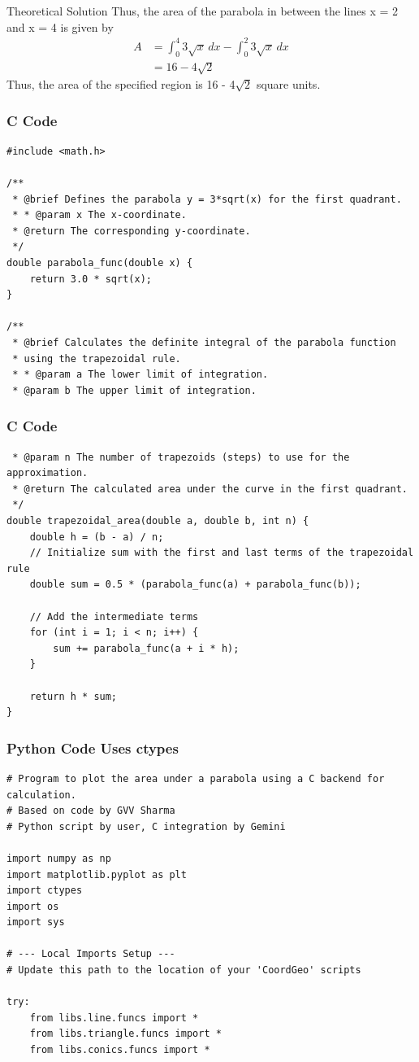 \documentclass{beamer}
\begin{document}
\begin{frame}{Theoretical Solution}
Thus, the area of the parabola in between the lines x = 2 and
x = 4 is given by
\begin{align}
A &= \int_{0}^{4} 3\sqrt{x} \, dx -\int_{0}^{2} 3\sqrt{x}\,dx  \\
&= 16 - 4\sqrt{2}
\end{align}
Thus, the area of the specified region is 16 - 4$\sqrt{2}$ square units.
\end{frame}
\begin{frame}[fragile]
\frametitle{C Code}
\begin{lstlisting}
#include <math.h>

/**
 * @brief Defines the parabola y = 3*sqrt(x) for the first quadrant.
 * * @param x The x-coordinate.
 * @return The corresponding y-coordinate.
 */
double parabola_func(double x) {
    return 3.0 * sqrt(x);
}

/**
 * @brief Calculates the definite integral of the parabola function 
 * using the trapezoidal rule.
 * * @param a The lower limit of integration.
 * @param b The upper limit of integration.
 \end{lstlisting}
 \end{frame}
\begin{frame}[fragile]
\frametitle{C Code}
\begin{lstlisting}
 * @param n The number of trapezoids (steps) to use for the approximation.
 * @return The calculated area under the curve in the first quadrant.
 */
double trapezoidal_area(double a, double b, int n) {
    double h = (b - a) / n;
    // Initialize sum with the first and last terms of the trapezoidal rule
    double sum = 0.5 * (parabola_func(a) + parabola_func(b));
    
    // Add the intermediate terms
    for (int i = 1; i < n; i++) {
        sum += parabola_func(a + i * h);
    }

    return h * sum;
}
 \end{lstlisting}
 \end{frame}
\begin{frame}[fragile]
\frametitle{Python Code Uses ctypes}
\begin{lstlisting}
# Program to plot the area under a parabola using a C backend for calculation.
# Based on code by GVV Sharma
# Python script by user, C integration by Gemini

import numpy as np
import matplotlib.pyplot as plt
import ctypes
import os
import sys

# --- Local Imports Setup ---
# Update this path to the location of your 'CoordGeo' scripts

try:
    from libs.line.funcs import *
    from libs.triangle.funcs import *
    from libs.conics.funcs import *
     \end{lstlisting}
 \end{frame}
\end{document}
